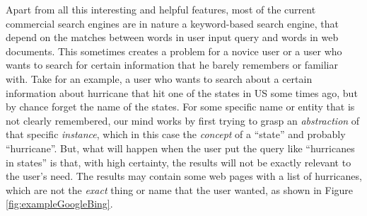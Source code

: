 Apart from all this interesting and helpful features, most of the 
current commercial search engines are in nature a keyword-based 
search engine, that depend on the matches between words in user 
input query and words in web documents. This sometimes creates a 
problem for a novice user or a user who wants to search for certain 
information that he barely remembers or familiar with. Take for an 
example, a user who wants to search about a certain information about 
hurricane that hit one of the states in US some times ago, but by 
chance forget the name of the states. For some specific name or entity 
that is not clearly remembered, our mind works by first trying to 
grasp an \textit{abstraction} of that specific \textit{instance}, which 
in this case the \textit{concept} of a ``state'' and probably 
``hurricane''. But, what will happen when the user put the query 
like ``hurricanes in states'' is that, with high certainty, the 
results will not be exactly relevant to the user's need. The results 
may contain some web pages  with a list of hurricanes, which are not 
the \textit{exact} thing or name that the user wanted, as shown in 
Figure \ref{fig:exampleGoogleBing}.

